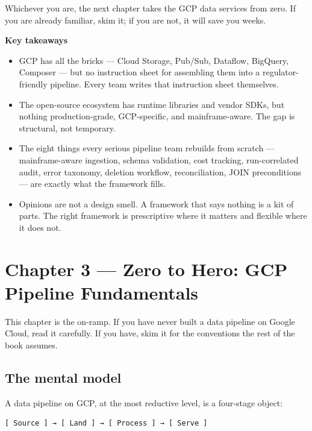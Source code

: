 \documentclass[
  11pt,
  british,
  oneside]{book}
\begin{document}
Whichever you are, the next chapter takes the GCP data services from
zero. If you are already familiar, skim it; if you are not, it will save
you weeks.

\begin{takeaways}
\textbf{Key takeaways}
\begin{itemize}
  \item GCP has all the bricks — Cloud Storage, Pub/Sub, Dataflow, BigQuery, Composer — but no instruction sheet for assembling them into a regulator-friendly pipeline. Every team writes that instruction sheet themselves.
  \item The open-source ecosystem has runtime libraries and vendor SDKs, but nothing production-grade, GCP-specific, and mainframe-aware. The gap is structural, not temporary.
  \item The eight things every serious pipeline team rebuilds from scratch — mainframe-aware ingestion, schema validation, cost tracking, run-correlated audit, error taxonomy, deletion workflow, reconciliation, JOIN preconditions — are exactly what the framework fills.
  \item Opinions are not a design smell. A framework that says nothing is a kit of parts. The right framework is prescriptive where it matters and flexible where it does not.
\end{itemize}
\end{takeaways}

\newpage

\hypertarget{chapter-3-zero-to-hero-gcp-pipeline-fundamentals}{%
\chapter{Chapter 3 --- Zero to Hero: GCP Pipeline
Fundamentals}\label{chapter-3-zero-to-hero-gcp-pipeline-fundamentals}}

This chapter is the on-ramp. If you have never built a data pipeline on
Google Cloud, read it carefully. If you have, skim it for the
conventions the rest of the book assumes.

\hypertarget{the-mental-model}{%
\section{The mental model}\label{the-mental-model}}

A data pipeline on GCP, at the most reductive level, is a four-stage
object:

\begin{verbatim}
[ Source ] → [ Land ] → [ Process ] → [ Serve ]
\end{verbatim}
\end{document}
